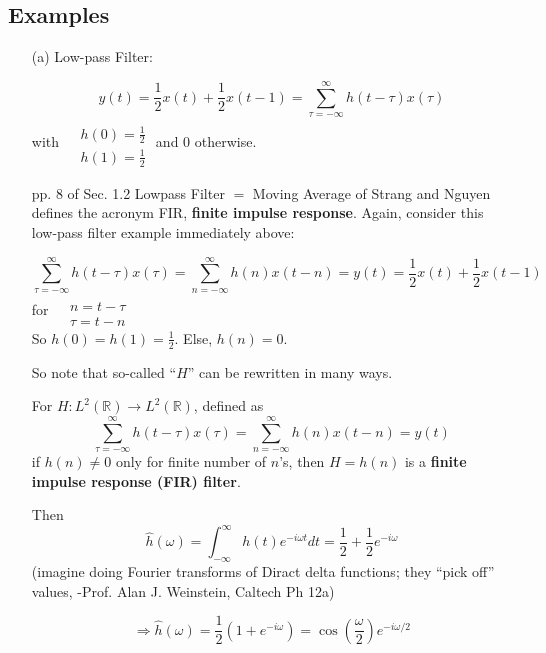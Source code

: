 \documentclass[twoside]{amsart}
\theoremstyle{plain}
\theoremstyle{definition}
\theoremstyle{remark}
\numberwithin{equation}{section}
\begin{document}
\subsection*{Examples}
\begin{enumerate}
\item[(a)]
Low-pass Filter:

\begin{equation}\label{Eq:lowpassfilterteg0}
y(t) = \frac{1}{2} x(t) + \frac{1}{2} x(t-1) = \sum_{\tau=-\infty}^{\infty} h(t-\tau) x(\tau)
\end{equation}
with $\begin{aligned} & \quad \\
  & h(0) = \frac{1}{2} \\
  & h(1) = \frac{1}{2} \end{aligned}$ and $0$ otherwise.  

pp. 8 of Sec. 1.2 Lowpass Filter $=$ Moving Average of Strang and Nguyen \cite{GStrangTNguyen1996} defines the acronym FIR, \textbf{finite impulse response}.  Again, consider this low-pass filter example immediately above:

\[
\sum_{\tau=-\infty}^{\infty} h(t-\tau)x(\tau) = \sum_{n=-\infty}^{\infty} h(n)x(t-n) = y(t) = \frac{1}{2} x(t) + \frac{1}{2} x(t-1) 
\]
for $\begin{aligned} & \quad \\ 
  & n=t-\tau \\
  & \tau = t- n \end{aligned}$ \\
So $h(0) = h(1) = \frac{1}{2}$.  Else,  $h(n)=0$.  

So note that so-called ``$H$'' can be rewritten in many ways.  

For $H:L^2(\mathbb{R}) \to L^2(\mathbb{R})$, defined as 
\[
\sum_{\tau=-\infty}^{\infty} h(t-\tau)x(\tau) = \sum_{n=-\infty}^{\infty} h(n)x(t-n) = y(t)
\]
if $h(n) \neq 0$ only for finite number of $n$'s, then $H = h(n)$ is a \textbf{finite impulse response (FIR) filter}.  




Then
\[
\widehat{h}(\omega) = \int_{-\infty}^{\infty} h(t) e^{-i\omega t} dt = \frac{1}{2} + \frac{1}{2} e^{-i\omega}
\]
(imagine doing Fourier transforms of Diract delta functions; they ``pick off'' values, -Prof. Alan J. Weinstein, Caltech Ph 12a)

\begin{equation}\label{Eq:lowpassfilteromegaeg0}
\Longrightarrow \widehat{h}(\omega) = \frac{1}{2}( 1 + e^{-i\omega}) = \cos{ \left( \frac{\omega}{2} \right) } e^{-i \omega/2}
\end{equation}


\end{enumerate}
\end{document}
